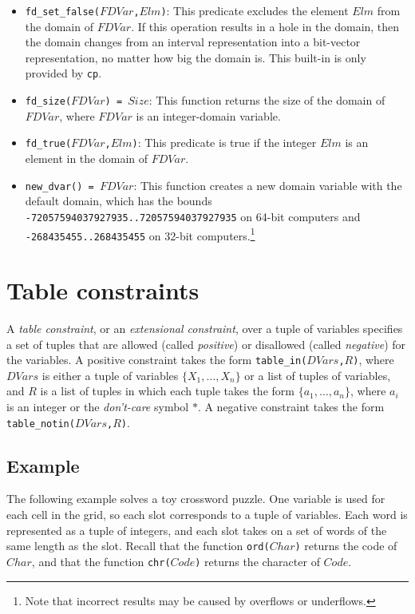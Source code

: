 \begin{itemize}
\item \texttt{fd\_set\_false($FDVar$,$Elm$)}: This predicate excludes the element $Elm$ from the domain of $FDVar$. If this operation results in a hole in the domain, then the domain changes from an interval representation into a bit-vector representation, no matter how big the domain is. This built-in is only provided by {\tt cp}.
\item \texttt{fd\_size($FDVar$) = $Size$}: This function returns the size of the domain of $FDVar$,  where $FDVar$ is an integer-domain variable.
\item \texttt{fd\_true($FDVar$,$Elm$)}: This predicate is true if the integer $Elm$ is an element in the domain of $FDVar$.
\item \texttt{new\_dvar() = $FDVar$}: This function creates a new domain variable with the default domain, which has the bounds \texttt{-72057594037927935..72057594037927935} on 64-bit computers and \texttt{-268435455..268435455} on 32-bit computers.\footnote{Note that incorrect results may be caused by overflows or underflows.}
\end{itemize}

\section{Table constraints}
A \emph{table constraint}, or an \emph{extensional constraint}, over a tuple of variables specifies a set of tuples that are allowed (called \emph{positive}) or disallowed (called \emph{negative}) for the variables. A positive constraint takes the form \texttt{table\_in($DVars$,$R$)}, where $DVars$ is either a tuple of variables $\{X_1,\ldots,X_n\}$ or a list of tuples of variables, and $R$ is a list of tuples in which each tuple takes the form $\{a_1,\ldots,a_n\}$, where $a_i$ is an integer or the \textit{don't-care} symbol $*$.  A negative constraint takes the form \texttt{table\_notin($DVars$,$R$)}.

\subsection*{Example}
The following example solves a toy crossword puzzle. One variable is used for each cell in the grid, so each slot corresponds to a tuple of variables. Each word is represented as a tuple of integers, and each slot takes on a set of words of the same length as the slot. Recall that the function \texttt{ord($Char$)} returns the code of $Char$, and that the function \texttt{chr($Code$)} returns the character of $Code$.

